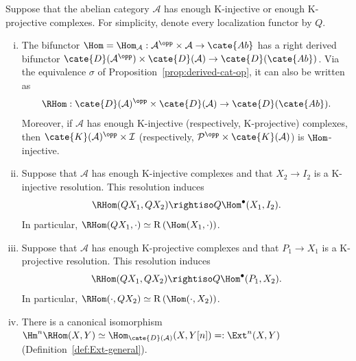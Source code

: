 \begin{theorem}\label{prop:unbounded-RHom}
	Suppose that the abelian category $\mathcal{A}$ has enough K-injective or
	enough K-projective complexes. For simplicity, denote every localization
	functor by $Q$.
	\begin{enumerate}[(i)]
		\item The bifunctor
		$\Hom=\Hom_{\mathcal{A}}:\mathcal{A}^{\opp}\times\mathcal{A}
		\to\cate{Ab}$ has a right derived bifunctor
		$\cate{D}(\mathcal{A}^{\opp})\times\cate{D}(\mathcal{A})
		\to\cate{D}(\cate{Ab})$. Via the equivalence $\sigma$ of
		Proposition~\ref{prop:derived-cat-op}, it can also be written as
		\[ \RHom: \cate{D}(\mathcal{A})^{\opp} \times \cate{D}(\mathcal{A}) \to \cate{D}(\cate{Ab}). \]
		Moreover, if $\mathcal{A}$ has enough K-injective (respectively,
		K-projective) complexes, then
		$\cate{K}(\mathcal{A})^{\opp}\times\mathcal{I}$ (respectively,
		$\mathcal{P}^{\opp}\times\cate{K}(\mathcal{A})$) is
		$\Hom$-injective.
		\item Suppose that $\mathcal{A}$ has enough K-injective complexes and
		that $X_2\to I_2$ is a K-injective resolution. This resolution induces
		\[ \RHom(Q X_1, Q X_2) \rightiso Q \Hom^\bullet(X_1, I_2). \]
		In particular,
		$\RHom(QX_1,\cdot)\simeq
		\mathrm{R}\left(\Hom(X_1,\cdot)\right)$.
		\item Suppose that $\mathcal{A}$ has enough K-projective complexes and
		that $P_1\to X_1$ is a K-projective resolution. This resolution induces
		\[ \RHom(Q X_1, Q X_2) \rightiso Q \Hom^\bullet(P_1, X_2). \]
		In particular,
		$\RHom(\cdot,QX_2)\simeq
		\mathrm{R}\left(\Hom(\cdot,X_2)\right)$.
		\item There is a canonical isomorphism
		$\Hm^n\RHom(X,Y)\simeq
		\Hom_{\cate{D}(\mathcal{A})}(X,Y[n])=: \Ext^n(X,Y)$
		(Definition~\ref{def:Ext-general}).
	\end{enumerate}
\end{theorem}
